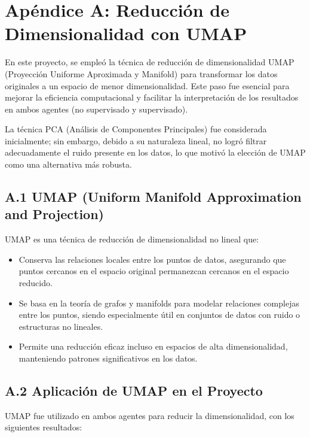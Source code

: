 \documentclass[12pt,a4paper]{article}
\begin{document}

\newpage


\appendix
\section*{Apéndice A: Reducción de Dimensionalidad con UMAP}

En este proyecto, se empleó la técnica de reducción de dimensionalidad UMAP (Proyección Uniforme Aproximada y Manifold) para transformar los datos originales a un espacio de menor dimensionalidad. Este paso fue esencial para mejorar la eficiencia computacional y facilitar la interpretación de los resultados en ambos agentes (no supervisado y supervisado).

La técnica PCA (Análisis de Componentes Principales) fue considerada inicialmente; sin embargo, debido a su naturaleza lineal, no logró filtrar adecuadamente el ruido presente en los datos, lo que motivó la elección de UMAP como una alternativa más robusta.

\subsection*{A.1 UMAP (Uniform Manifold Approximation and Projection)}
UMAP es una técnica de reducción de dimensionalidad no lineal que:
\begin{itemize}
    \item Conserva las relaciones locales entre los puntos de datos, asegurando que puntos cercanos en el espacio original permanezcan cercanos en el espacio reducido.
    \item Se basa en la teoría de grafos y manifolds para modelar relaciones complejas entre los puntos, siendo especialmente útil en conjuntos de datos con ruido o estructuras no lineales.
    \item Permite una reducción eficaz incluso en espacios de alta dimensionalidad, manteniendo patrones significativos en los datos.
\end{itemize}

\subsection*{A.2 Aplicación de UMAP en el Proyecto}
UMAP fue utilizado en ambos agentes para reducir la dimensionalidad, con los siguientes resultados:
\end{document}

